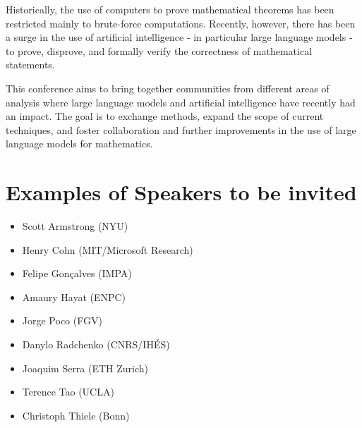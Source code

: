 \documentclass[a4paper]{amsart}
\begin{document}
Historically, the use of computers to prove mathematical theorems has been restricted mainly to brute-force computations. Recently, however, there has been a surge in the use of artificial intelligence - in particular large language models - to prove, disprove, and formally verify the correctness of mathematical statements.

This conference aims to bring together communities from different areas of analysis where large language models and artificial intelligence have recently had an impact. The goal is to exchange methods, expand the scope of current techniques, and foster collaboration and further improvements in the use of large language models for mathematics.

\section*{Examples of Speakers to be invited}

\begin{itemize}
  \item Scott Armstrong (NYU)
  \item Henry Cohn (MIT/Microsoft Research)
  \item Felipe Gonçalves (IMPA)
  \item Amaury Hayat (ENPC)
  \item Jorge Poco (FGV)
  \item Danylo Radchenko (CNRS/IHÉS)
  \item Joaquim Serra (ETH Zurich)
  \item Terence Tao (UCLA)
  \item Christoph Thiele (Bonn)
\end{itemize}
\end{document}
